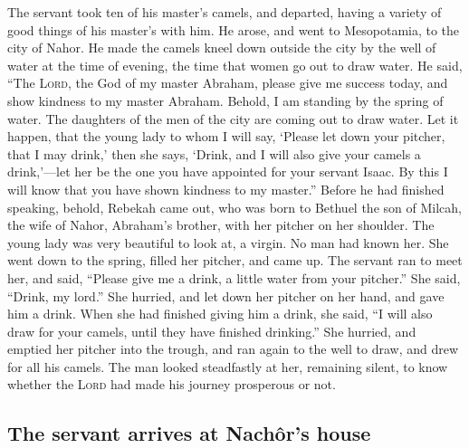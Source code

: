  The servant took ten of his master's camels, and
departed, having a variety of good things of his master's with him. He
arose, and went to Mesopotamia, to the city of Nahor.  He
made the camels kneel down outside the city by the well of water at the
time of evening, the time that women go out to draw water.
 He said, ``The \textsc{Lord}, the God of my master
Abraham, please give me success today, and show kindness to my master
Abraham.  Behold, I am standing by the spring of water.
The daughters of the men of the city are coming out to draw water.
 Let it happen, that the young lady to whom I will say,
`Please let down your pitcher, that I may drink,' then she says, `Drink,
and I will also give your camels a drink,'---let her be the one you have
appointed for your servant Isaac. By this I will know that you have
shown kindness to my master.''  Before he had finished
speaking, behold, Rebekah came out, who was born to Bethuel the son of
Milcah, the wife of Nahor, Abraham's brother, with her pitcher on her
shoulder.  The young lady was very beautiful to look at,
a virgin. No man had known her. She went down to the spring, filled her
pitcher, and came up.  The servant ran to meet her, and
said, ``Please give me a drink, a little water from your pitcher.''
 She said, ``Drink, my lord.'' She hurried, and let down
her pitcher on her hand, and gave him a drink.  When she
had finished giving him a drink, she said, ``I will also draw for your
camels, until they have finished drinking.''  She
hurried, and emptied her pitcher into the trough, and ran again to the
well to draw, and drew for all his camels.  The man
looked steadfastly at her, remaining silent, to know whether the
\textsc{Lord} had made his journey prosperous or not.

\hypertarget{the-servant-arrives-at-nachuxf4rs-house}{%
\subsection{The servant arrives at Nachôr's
house}\label{the-servant-arrives-at-nachuxf4rs-house}}

